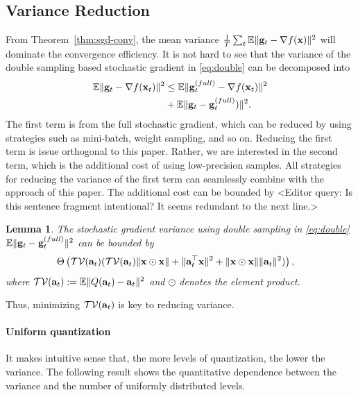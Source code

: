 \documentclass{article}
\def\a{{\bf a}}
\def\g{{\bf g}}
\def\x{{\bf x}}
\def\E{\mathbb{E}}
\newtheorem{lemma}{Lemma}
\begin{document}
\vspace{-0.5em}
\subsection{Variance Reduction}
\vspace{-0.5em}

From Theorem~\ref{thm:sgd-conv}, the mean variance ${1\over T}\sum_{t}\E\|\g_t - \nabla f(\x)\|^2$ will dominate the convergence efficiency. It is not hard to see that the variance of the double sampling based stochastic gradient in \eqref{eq:double} can be decomposed into
\vspace{-0.5em}
\begin{align*}
\E\|\g_t - \nabla f(\x_t)\|^2 & \leq \E \|\g_t^{(full)}- \nabla f(\x_t)\|^2 
\\
&+ \E \|\g_t - \g_t^{(full)})\|^2.
\end{align*}
The first term is from the full stochastic gradient, which can be reduced by using strategies such as mini-batch, weight sampling, and so on. Reducing the first term is issue orthogonal to this paper. 
Rather, we are interested in the second term, which is the additional cost of using low-precision samples. All strategies for reducing the variance of the first term can seamlessly combine with the approach of this paper. 
The additional cost can be bounded by <Editor query: Is this sentence fragment intentional? It seems redundant to the next line.>
\begin{lemma} 
The stochastic gradient variance using double sampling in \eqref{eq:double} $\E\|\g_t - \g_t^{(full)}\|^2$ can be bounded by
\begin{align*}
&\Theta\left(\mathcal{TV}(\a_t) (\mathcal{TV}(\a_t)\|\x\odot \x\| + \|\a_t^\top \x\|^2 + \|\x\odot \x\|\|\a_t\|^2)\right),
\end{align*}
where $\mathcal{TV}(\a_t) := \E\|Q(\a_t) - \a_t\|^2$ and $\odot$ denotes the element product.
\end{lemma}
Thus, minimizing $\mathcal{TV}(\a_t)$ is key to reducing variance. 

\vspace{-0.5em}
\paragraph{Uniform quantization} It makes intuitive sense that, the more levels of quantization, the lower the variance. The following result shows the quantitative dependence between the variance and the number of uniformly distributed levels. 
\end{document}
